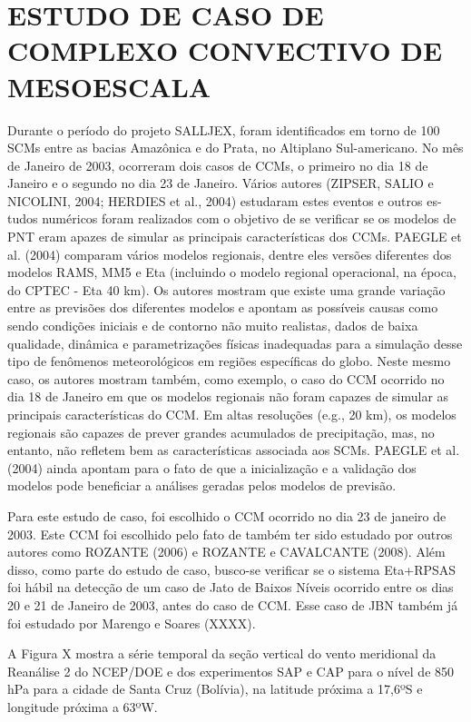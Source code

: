 \hypertarget{estilo:capitulo}{}
\chapter{ESTUDO DE CASO DE COMPLEXO CONVECTIVO DE MESOESCALA}

Durante o período do projeto SALLJEX, foram identificados em torno de 100 SCMs entre as bacias Amazônica e do Prata, no Altiplano Sul-americano. No mês de Janeiro de 2003, ocorreram dois casos de CCMs, o primeiro no dia 18 de Janeiro e o segundo no dia 23 de Janeiro. Vários autores (ZIPSER, SALIO e NICOLINI, 2004; HERDIES et al., 2004) estudaram estes eventos e outros es-tudos numéricos foram realizados com o objetivo de se verificar se os modelos de PNT eram apazes de simular as principais características dos CCMs. PAEGLE et al. (2004) comparam vários modelos regionais, dentre eles versões diferentes dos modelos RAMS, MM5 e Eta (incluindo o modelo regional operacional, na época, do CPTEC - Eta 40 km). Os autores mostram que existe uma grande variação entre as previsões dos diferentes modelos e apontam as possíveis causas como sendo condições iniciais e de contorno não muito realistas, dados de baixa qualidade, dinâmica e parametrizações físicas inadequadas para a simulação desse tipo de fenômenos meteorológicos em regiões específicas do globo. Neste mesmo caso, os autores mostram também, como exemplo, o caso do CCM ocorrido no dia 18 de Janeiro em que os modelos regionais não foram capazes de simular as principais características do CCM. Em altas resoluções (e.g., 20 km), os modelos regionais são capazes de prever grandes acumulados de precipitação, mas, no entanto, não refletem bem as características associada aos SCMs. PAEGLE et al. (2004) ainda apontam para o fato de que a inicialização e a validação dos modelos pode beneficiar a análises geradas pelos modelos de previsão.

Para este estudo de caso, foi escolhido o CCM ocorrido no dia 23 de janeiro de 2003. Este CCM foi escolhido pelo fato de também ter sido estudado por outros autores como ROZANTE (2006) e ROZANTE e CAVALCANTE (2008). Além disso, como parte do estudo de caso, busco-se verificar se o sistema Eta+RPSAS foi hábil na detecção de um caso de Jato de Baixos Níveis ocorrido entre os dias 20 e 21 de Janeiro de 2003, antes do caso de CCM. Esse caso de JBN também já foi estudado por Marengo e Soares (XXXX).

A Figura X mostra a série temporal da seção vertical do vento meridional da Reanálise 2 do NCEP/DOE e dos experimentos SAP e CAP para o nível de 850 hPa para a cidade de Santa Cruz (Bolívia), na latitude próxima a 17,6ºS e longitude próxima a 63ºW.

